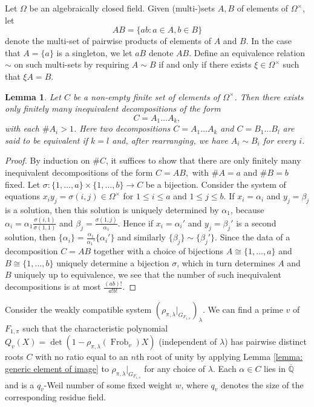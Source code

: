 \documentclass{amsart}
\newtheorem{lemma}[theorem]{Lemma}
\theoremstyle{definition}
\numberwithin{equation}{section} %
\newcommand{\Frob}{\operatorname{Frob}}
\newcommand{\bb}[1]{\mathbb{#1}}
\newcommand{\ol}[1]{\overline{#1}}
\begin{document}
Let $\Omega$ be an algebraically closed field.
Given (multi-)sets $A,B$ of elements of $\Omega^\times$, let
\[
AB = \{ab: a \in A, b \in B\}
\]
denote the multi-set of pairwise products of elements of $A$ and $B$.
In the case that $A = \{a\}$ is a singleton, we let $aB$ denote $AB$.
Define an equivalence relation $\sim$ on such multi-sets by requiring $A \sim B$ if and only if there exists $\xi \in \Omega^\times$ such that $\xi A = B$. 
\begin{lemma}
Let $C$ be a non-empty finite set of elements of $\Omega^\times$.
Then there exists only finitely many inequivalent decompositions of the form 
\[
C = A_1 \ldots A_k,
\]
with each $\# A_i > 1$.
Here two decompositions $C = A_1 \ldots A_k$ and $C = B_1 \ldots B_l$ are said to be equivalent if $k = l$ and, after rearranging, we have $A_i \sim B_i$ for every $i$.
\end{lemma}
\begin{proof}
By induction on $\# C$, it suffices to show that there are only finitely many inequivalent decompositions of the form $C = AB,$ with $\# A = a$ and $\# B = b$ fixed.
Let $\sigma: \{1,\ldots,a\} \times \{1,\ldots,b\} \to C$ be a bijection.
Consider the system of equations $x_i y_j = \sigma(i,j) \in \Omega^\times$ for $1 \leq i \leq a$ and $1 \leq j \leq b$.
If $x_i = \alpha_{i}$ and $y_j = \beta_{j}$ is a solution, then this solution is uniquely determined by $\alpha_1$, because $\alpha_i = \alpha_1 \frac{\sigma(i,1)}{\sigma(1,1)}$ and $\beta_j = \frac{\sigma(1,j)}{\alpha_1}$.
Hence if $x_i = \alpha_{i}'$ and $y_j = \beta_{j}'$ is a second solution, then $\{\alpha_i\} = \frac{\alpha_1}{\alpha_1'} \{\alpha_i'\}$ and similarly $\{\beta_j\} \sim \{\beta_j'\}$.
Since the data of a decomposition $C = AB$ together with a choice of bijections $A \cong \{1,\ldots,a\}$ and $B \cong \{1,\ldots,b\}$ uniquely determine a bijection $\sigma$, which in turn determines $A$ and $B$ uniquely up to equivalence, we see that the number of such inequivalent decompositions is at most $\frac{(ab)!}{a! b!}$.
\end{proof}

Consider the weakly compatible system $(\rho_{\pi,\lambda}|_{G_{F_{1,\pi}}})_\lambda$.
We can find a prime $v$ of $F_{1,\pi}$ such that the characteristic polynomial $Q_{v}(X) = \det(1- \rho_{\pi,\lambda}(\Frob_v)X)$ (independent of $\lambda$) has pairwise distinct roots $C$ with no ratio equal to an $n$th root of unity by applying Lemma \ref{lemma: generic element of image} to $\rho_{\pi,\lambda}|_{G_{F_{1,\pi}}}$ for any choice of $\lambda$.
Each $\alpha \in C$ lies in $\ol{\bb{Q}}$ and is a $q_v$-Weil number of some fixed weight $w$, where $q_v$ denotes the size of the corresponding residue field.
\end{document}
